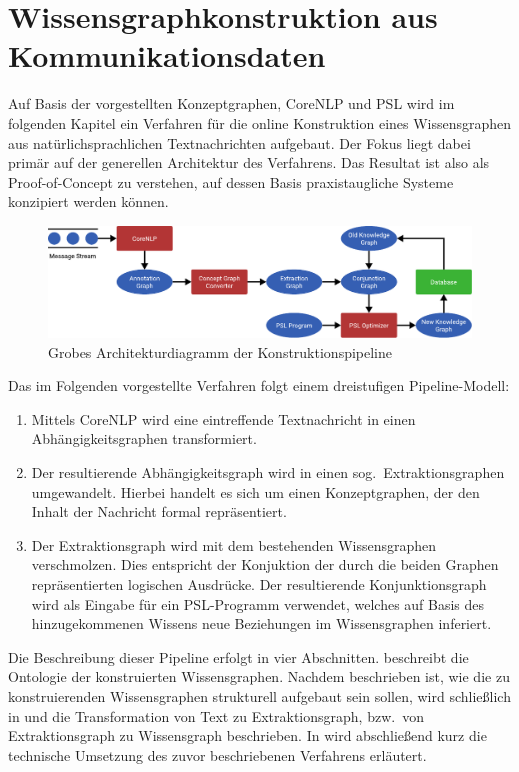 \def\cgScale{0.6}

\chapter{Wissensgraph\-konstruktion aus Kommunikations\-daten}%
\label{sec:text2kg}

Auf Basis der vorgestellten Konzeptgraphen, CoreNLP und PSL wird im folgenden Kapitel ein Verfahren für die online Konstruktion eines Wissensgraphen aus natürlichsprachlichen Textnachrichten aufgebaut.
Der Fokus liegt dabei primär auf der generellen Architektur des Verfahrens.
Das Resultat ist also als Proof-of-Concept zu verstehen, auf dessen Basis praxistaugliche Systeme konzipiert werden können.

\begin{figure}[h]
	\includegraphics[width=\textwidth]{gfx/text2kg/architecture.pdf}
	\caption{Grobes Architekturdiagramm der Konstruktionspipeline}\label{fig:text2kg:architecture}
\end{figure}
Das im Folgenden vorgestellte Verfahren folgt einem dreistufigen Pipeline-Modell:
\begin{enumerate}
	\item Mittels CoreNLP wird eine eintreffende Textnachricht in einen Abhängigkeitsgraphen transformiert.
	\item Der resultierende Abhängigkeitsgraph wird in einen sog.\ Extraktionsgraphen umgewandelt.
		Hierbei handelt es sich um einen Konzeptgraphen, der den Inhalt der Nachricht formal repräsentiert.
	\item Der Extraktionsgraph wird mit dem bestehenden Wissensgraphen verschmolzen.
		Dies entspricht der Konjuktion der durch die beiden Graphen repräsentierten logischen Ausdrücke.
		Der resultierende Konjunktionsgraph wird als Eingabe für ein PSL-Programm verwendet, welches auf Basis des hinzugekommenen Wissens neue Beziehungen im Wissensgraphen inferiert.
\end{enumerate}
Die Beschreibung dieser Pipeline erfolgt in vier Abschnitten.
 beschreibt die Ontologie der konstruierten Wissensgraphen.
Nachdem beschrieben ist, wie die zu konstruierenden Wissensgraphen strukturell aufgebaut sein sollen, wird schließlich in  und  die Transformation von Text zu Extraktionsgraph, bzw.\ von Extraktionsgraph zu Wissensgraph beschrieben.
In  wird abschließend kurz die technische Umsetzung des zuvor beschriebenen Verfahrens erläutert.

